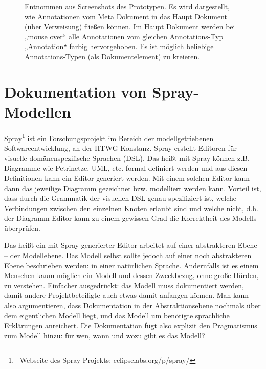  
\begin{figure}[h!]
\centering
\advance\leftskip-2.5cm
\caption{ Entnommen aus Screenshots des Prototypen. Es wird dargestellt, wie Annotationen vom Meta Dokument in das Haupt Dokument (über Verweisung) fließen können. Im Haupt Dokument werden bei „mouse over“ alle Annotationen vom gleichen Annotations-Typ „Annotation“ farbig hervorgehoben. Es ist möglich beliebige Annotations-Typen (als Dokumentelement) zu kreieren. }\label{annotation}
\end{figure}
 
\section{Dokumentation von Spray-Modellen}\label{doku-spray}
 
Spray\footnote{~Webseite des Spray Projekts: eclipselabs.org/p/spray/} ist ein Forschungsprojekt im Bereich der modellgetriebenen Softwareentwicklung, an der HTWG Konstanz. Spray erstellt Editoren für visuelle domänenspezifische Sprachen (DSL). Das heißt mit Spray können z.B. Diagramme wie Petrinetze, UML, etc. formal definiert werden und aus diesen Definitionen kann ein Editor generiert werden. Mit einem solchen Editor kann dann das jeweilige Diagramm gezeichnet bzw. modelliert werden kann. Vorteil ist, dass durch die Grammatik der visuellen DSL genau spezifiziert ist, welche Verbindungen zwischen den einzelnen Knoten erlaubt sind und welche nicht, d.h. der Diagramm Editor kann zu einem gewissen Grad die Korrektheit des Modells überprüfen.

 
Das heißt ein mit Spray generierter Editor arbeitet auf einer abstrakteren Ebene -- der Modellebene. Das Modell selbst sollte jedoch auf einer noch abstrakteren Ebene beschrieben werden: in einer natürlichen Sprache. Andernfalls ist es einem Menschen kaum möglich ein Modell und dessen Zweckbezug, ohne große Hürden, zu verstehen. Einfacher ausgedrückt: das Modell muss dokumentiert werden, damit andere Projektbeteiligte auch etwas damit anfangen können. Man kann also argumentieren, dass Dokumentation in der Abstraktionsebene nochmals über dem eigentlichen Modell liegt, und das Modell um benötigte sprachliche Erklärungen anreichert. Die Dokumentation fügt also explizit den Pragmatismus zum Modell hinzu: für wen, wann und wozu gibt es das Modell?

